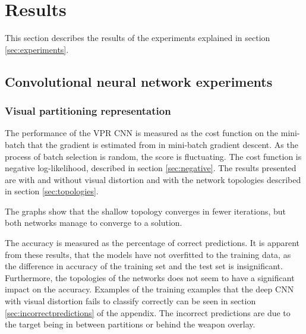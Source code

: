 
\section{Results}
This section describes the results of the experiments explained in section \ref{sec:experiments}.

\label{sec:results}

\subsection{Convolutional neural network experiments}
\subsubsection{Visual partitioning representation}
The performance of the VPR CNN is measured as the cost function on the mini-batch that the gradient is estimated from in mini-batch gradient descent. As the process of batch selection is random, the score is fluctuating. The cost function is negative log-likelihood, described in section \ref{sec:negative}.
The results presented are with and without visual distortion and with the network topologies described in section \ref{sec:topologies}.


\noindent
The graphs show that the shallow topology converges in fewer iterations, but both networks manage to converge to a solution. 


\noindent
The accuracy is measured as the percentage of correct predictions. It is apparent from these results, that the models have not overfitted to the training data, as the difference in accuracy of the training set and the test set is insignificant. Furthermore, the topologies of the networks does not seem to have a significant impact on the accuracy. Examples of the training examples that the deep CNN with visual distortion fails to classify correctly can be seen in section \ref{sec:incorrectpredictions} of the appendix. The incorrect predictions are due to the target being in between partitions or behind the weapon overlay.

%
%




